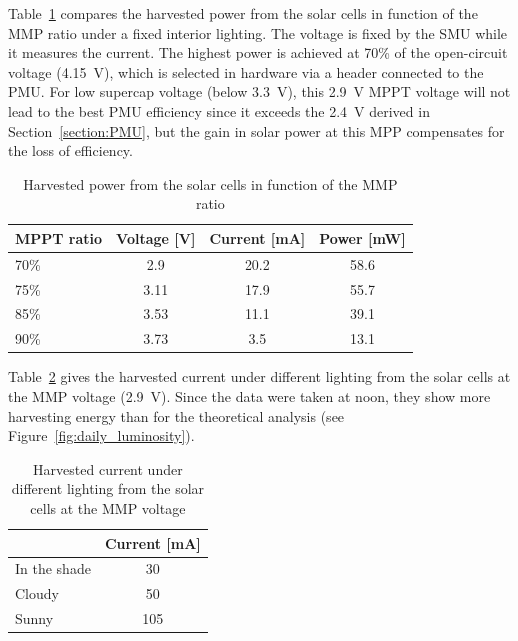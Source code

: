 \documentclass{EPL-master-thesis-covers-EN}
\begin{document}
Table~\ref{tab:val_current_solar_sel} compares the harvested power from the solar cells in function of the MMP ratio under a fixed interior lighting. The voltage is fixed by the SMU while it measures the current. The highest power is achieved at 70\% of the open-circuit voltage (\SI{4.15}{V}), which is selected in hardware via a header connected to the PMU. For low supercap voltage (below \SI{3.3}{V}), this \SI{2.9}{V} MPPT voltage will not lead to the best PMU efficiency since it exceeds the \SI{2.4}{V} derived in Section~\ref{section:PMU}, but the gain in solar power at this MPP compensates for the loss of efficiency.

\begin{table}[H]
\centering
\begin{tabular}{lccc}
\toprule
  MPPT ratio & Voltage [V] & Current [mA] & Power [mW]  \\ \midrule
 70\%        & 2.9         & 20.2         & 58.6        \\
 75\%        & 3.11        & 17.9         & 55.7        \\
 85\%        & 3.53        & 11.1         & 39.1        \\
 90\%        & 3.73        & 3.5          & 13.1        \\ \bottomrule
\end{tabular}
\caption{Harvested power from the solar cells in function of the MMP ratio}
\label{tab:val_current_solar_sel}
\end{table}


Table~\ref{tab:val_current_harvested} gives the harvested current under different lighting from the solar cells at the MMP voltage (\SI{2.9}{V}). Since the data were taken at noon, they show more harvesting energy than for the theoretical analysis (see Figure~\ref{fig:daily_luminosity}).

\begin{table}[H]
\centering
\begin{tabular}{lc}
\toprule
                     & Current [\si{mA}]  \\ \midrule
 In the shade        & 30                 \\
 Cloudy              & 50                 \\
 Sunny               & 105                \\ \bottomrule
\end{tabular}
\caption{Harvested current under different lighting from the solar cells at the MMP voltage}
\label{tab:val_current_harvested}
\end{table}
\end{document}
